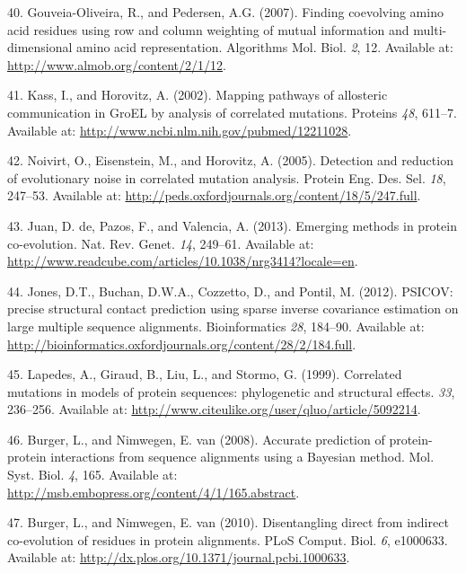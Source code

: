 \documentclass[12pt,a4paper,twoside]{book}
\theoremstyle{definition}
\theoremstyle{definition}
\theoremstyle{remark}
\begin{document}
\hypertarget{ref-Gouveia_Oliveira2007}{}
40. Gouveia-Oliveira, R., and Pedersen, A.G. (2007). Finding coevolving
amino acid residues using row and column weighting of mutual information
and multi-dimensional amino acid representation. Algorithms Mol. Biol.
\emph{2}, 12. Available at: \url{http://www.almob.org/content/2/1/12}.

\hypertarget{ref-Kass2002}{}
41. Kass, I., and Horovitz, A. (2002). Mapping pathways of allosteric
communication in GroEL by analysis of correlated mutations. Proteins
\emph{48}, 611--7. Available at:
\url{http://www.ncbi.nlm.nih.gov/pubmed/12211028}.

\hypertarget{ref-Noivirt2005}{}
42. Noivirt, O., Eisenstein, M., and Horovitz, A. (2005). Detection and
reduction of evolutionary noise in correlated mutation analysis. Protein
Eng. Des. Sel. \emph{18}, 247--53. Available at:
\url{http://peds.oxfordjournals.org/content/18/5/247.full}.

\hypertarget{ref-DeJuan2013}{}
43. Juan, D. de, Pazos, F., and Valencia, A. (2013). Emerging methods in
protein co-evolution. Nat. Rev. Genet. \emph{14}, 249--61. Available at:
\url{http://www.readcube.com/articles/10.1038/nrg3414?locale=en}.

\hypertarget{ref-Jones2012}{}
44. Jones, D.T., Buchan, D.W.A., Cozzetto, D., and Pontil, M. (2012).
PSICOV: precise structural contact prediction using sparse inverse
covariance estimation on large multiple sequence alignments.
Bioinformatics \emph{28}, 184--90. Available at:
\url{http://bioinformatics.oxfordjournals.org/content/28/2/184.full}.

\hypertarget{ref-Lapedes1999}{}
45. Lapedes, A., Giraud, B., Liu, L., and Stormo, G. (1999). Correlated
mutations in models of protein sequences: phylogenetic and structural
effects. \emph{33}, 236--256. Available at:
\url{http://www.citeulike.org/user/qluo/article/5092214}.

\hypertarget{ref-Burger2008}{}
46. Burger, L., and Nimwegen, E. van (2008). Accurate prediction of
protein-protein interactions from sequence alignments using a Bayesian
method. Mol. Syst. Biol. \emph{4}, 165. Available at:
\url{http://msb.embopress.org/content/4/1/165.abstract}.

\hypertarget{ref-Burger2010}{}
47. Burger, L., and Nimwegen, E. van (2010). Disentangling direct from
indirect co-evolution of residues in protein alignments. PLoS Comput.
Biol. \emph{6}, e1000633. Available at:
\url{http://dx.plos.org/10.1371/journal.pcbi.1000633}.
\end{document}
